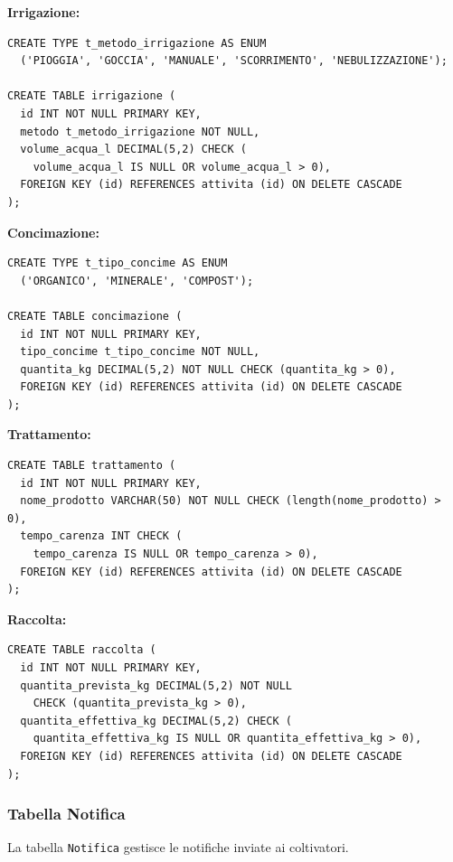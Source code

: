 \documentclass[12pt,a4paper]{article}
\begin{document}
\textbf{Irrigazione:}
\begin{lstlisting}[style=sqlstyle]
CREATE TYPE t_metodo_irrigazione AS ENUM 
  ('PIOGGIA', 'GOCCIA', 'MANUALE', 'SCORRIMENTO', 'NEBULIZZAZIONE');

CREATE TABLE irrigazione (
  id INT NOT NULL PRIMARY KEY,
  metodo t_metodo_irrigazione NOT NULL,
  volume_acqua_l DECIMAL(5,2) CHECK (
    volume_acqua_l IS NULL OR volume_acqua_l > 0),
  FOREIGN KEY (id) REFERENCES attivita (id) ON DELETE CASCADE 
);
\end{lstlisting}

\textbf{Concimazione:}
\begin{lstlisting}[style=sqlstyle]
CREATE TYPE t_tipo_concime AS ENUM 
  ('ORGANICO', 'MINERALE', 'COMPOST');

CREATE TABLE concimazione (
  id INT NOT NULL PRIMARY KEY,
  tipo_concime t_tipo_concime NOT NULL,
  quantita_kg DECIMAL(5,2) NOT NULL CHECK (quantita_kg > 0),
  FOREIGN KEY (id) REFERENCES attivita (id) ON DELETE CASCADE 
);
\end{lstlisting}

\textbf{Trattamento:}
\begin{lstlisting}[style=sqlstyle]
CREATE TABLE trattamento (
  id INT NOT NULL PRIMARY KEY,
  nome_prodotto VARCHAR(50) NOT NULL CHECK (length(nome_prodotto) > 0),
  tempo_carenza INT CHECK (
    tempo_carenza IS NULL OR tempo_carenza > 0),
  FOREIGN KEY (id) REFERENCES attivita (id) ON DELETE CASCADE 
);
\end{lstlisting}

\textbf{Raccolta:}
\begin{lstlisting}[style=sqlstyle]
CREATE TABLE raccolta (
  id INT NOT NULL PRIMARY KEY,
  quantita_prevista_kg DECIMAL(5,2) NOT NULL 
    CHECK (quantita_prevista_kg > 0),
  quantita_effettiva_kg DECIMAL(5,2) CHECK (
    quantita_effettiva_kg IS NULL OR quantita_effettiva_kg > 0),
  FOREIGN KEY (id) REFERENCES attivita (id) ON DELETE CASCADE 
);
\end{lstlisting}

\subsubsection{Tabella Notifica}

La tabella \texttt{Notifica} gestisce le notifiche inviate ai coltivatori.
\end{document}
